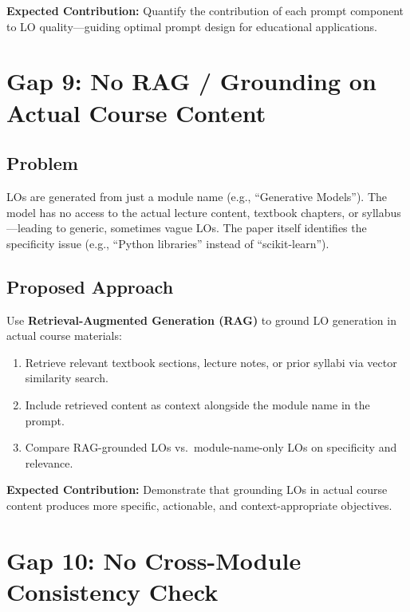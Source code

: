 \documentclass[11pt,a4paper]{article}
\begin{document}
\begin{notebox}
\textbf{Expected Contribution:} Quantify the contribution of each prompt component to LO quality---guiding optimal prompt design for educational applications.
\end{notebox}

\section{Gap 9: No RAG / Grounding on Actual Course Content}

\subsection{Problem}
LOs are generated from just a module name (e.g., ``Generative Models''). The model has no access to the actual lecture content, textbook chapters, or syllabus---leading to generic, sometimes vague LOs. The paper itself identifies the specificity issue (e.g., ``Python libraries'' instead of ``scikit-learn'').

\subsection{Proposed Approach}
Use \textbf{Retrieval-Augmented Generation (RAG)} to ground LO generation in actual course materials:
\begin{enumerate}[nosep]
    \item Retrieve relevant textbook sections, lecture notes, or prior syllabi via vector similarity search.
    \item Include retrieved content as context alongside the module name in the prompt.
    \item Compare RAG-grounded LOs vs.\ module-name-only LOs on specificity and relevance.
\end{enumerate}

\begin{notebox}
\textbf{Expected Contribution:} Demonstrate that grounding LOs in actual course content produces more specific, actionable, and context-appropriate objectives.
\end{notebox}

\section{Gap 10: No Cross-Module Consistency Check}
\end{document}
